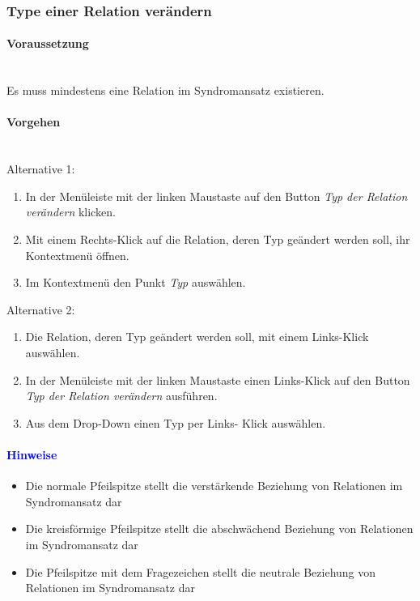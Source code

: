 \documentclass[enabledeprecatedfontcommands,fontsize=11pt,paper=a4,twoside]{scrartcl}
\newcounter{one}
\newcommand*{\hint}{\paragraph{\textcolor{blue}{Hinweise}}}
\newcommand*{\condition}{\paragraph{Voraussetzung}$\;$ \vspace{0.2cm}\\}
\newcommand*{\actions}{\paragraph{Vorgehen} $\;$\vspace{0.2cm}\\}
\begin{document}
		\subsubsection{Type einer Relation verändern}
		\condition
		Es muss mindestens eine Relation im Syndromansatz existieren.
		\actions
		Alternative 1:
		\begin{enumerate}
			\item In der Menüleiste mit der linken Maustaste auf den Button \textit{Typ der Relation verändern} klicken.
			\item Mit einem Rechts-Klick auf die Relation, deren Typ geändert werden soll, ihr Kontextmenü öffnen.
			\item Im Kontextmenü den Punkt \textit{Typ} auswählen.
		\end{enumerate}
		Alternative 2:
		\begin{enumerate}
			\item Die Relation, deren Typ geändert werden soll, mit einem Links-Klick auswählen.
			\item In der Menüleiste mit der linken Maustaste einen Links-Klick auf den Button \textit{Typ der Relation verändern} ausführen.
			\item Aus dem Drop-Down einen Typ per Links- Klick auswählen. 
		\end{enumerate}	
		\hint
		\begin{itemize}
			\item Die normale Pfeilspitze stellt die verstärkende Beziehung von Relationen im Syndromansatz dar
			\item Die kreisförmige Pfeilspitze stellt die abschwächend Beziehung von Relationen im Syndromansatz dar
			\item Die Pfeilspitze mit dem Fragezeichen stellt die neutrale Beziehung von Relationen im Syndromansatz dar
		\end{itemize}
		
				\newpage
\end{document}
